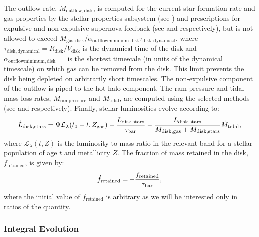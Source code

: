 The outflow rate, $\dot{M}_\mathrm{outflow, disk}$, is computed for the current star formation rate and gas properties by the stellar properties subsystem (see ) and prescriptions for expulsive and non-expulsive supernova feedback (see  and  respectively), but is not allowed to exceed $M_\mathrm{gas, disk}/ \alpha_\mathrm{outflow minimum, disk} \tau_\mathrm{disk, dynamical}$, where $\tau_\mathrm{disk, dynamical}=R_\mathrm{disk}/V_\mathrm{disk}$ is the dynamical time of the disk and $\alpha_\mathrm{outflow minimum, disk}=$\mono{[diskOutflowTimescaleMinimum]} is the shortest timescale (in units of the dynamical timescale) on which gas can be removed from the disk. This limit prevents the disk being depleted on arbitrarily short timescales. The non-expulsive \gls{component} of the outflow is piped to the hot halo component.  The ram pressure and tidal mass loss rates, $\dot{M}_\mathrm{ram pressure}$ and $\dot{M}_\mathrm{tidal}$, are computed using the selected methods (see  and  respectively).
Finally, stellar luminosities evolve according to:
\begin{equation}
\dot{L}_\mathrm{disk, stars} = \Psi \mathcal{L}_\lambda(t_0-t,Z_\mathrm{gas})  - {L_\mathrm{disk, stars} \over \tau_\mathrm{bar}} - {L_\mathrm{disk, stars} \over M_\mathrm{disk, gas} + M_\mathrm{disk, stars}} \dot{M}_\mathrm{tidal},
\end{equation}
where $\mathcal{L}_\lambda(t,Z)$ is the luminosity-to-mass ratio in the relevant band for a stellar population of age $t$ and metallicity $Z$. The fraction of mass retained in the disk, $f_\mathrm{retained}$, is given by:
\begin{equation}
  \dot{f}_\mathrm{retained} = - {f_\mathrm{retained} \over \tau_\mathrm{bar}},
\end{equation}
where the initial value of $f_\mathrm{retained}$ is arbitrary as we will be interested only in ratios of the quantity.

\subsubsection{Integral Evolution}

